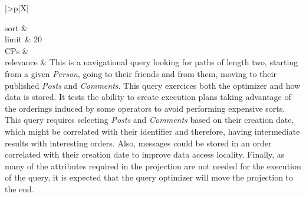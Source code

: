 \begin{tabularx}{\queryCardWidth}{|>{\queryPropertyCell}p{\queryPropertyCellWidth}|X|}
%
	
		sort		&
		\innerCardVSpace \\ \hline
	limit & 20 \\ \hline
	CPs &
	 \\ \hline
	relevance &
		\footnotesize This is a navigational query looking for paths of length two, starting
from a given \emph{Person}, going to their friends and from them, moving
to their published \emph{Posts} and \emph{Comments}. This query
exercices both the optimizer and how data is stored. It tests the
ability to create execution plans taking advantage of the orderings
induced by some operators to avoid performing expensive sorts. This
query requires selecting \emph{Posts} and \emph{Comments} based on their
creation date, which might be correlated with their identifier and
therefore, having intermediate results with interesting orders. Also,
messages could be stored in an order correlated with their creation date
to improve data access locality. Finally, as many of the attributes
required in the projection are not needed for the execution of the
query, it is expected that the query optimizer will move the projection
to the end.
 \\ \hline%
\end{tabularx}
\queryCardVSpace

\let\emph\oldemph
